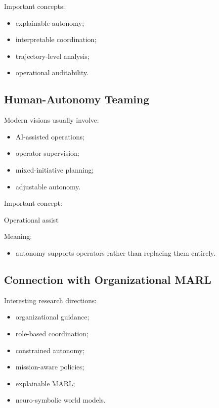 \documentclass[10pt,a4paper,twocolumn]{article}
\begin{document}
Important concepts:
\begin{itemize}
    \item explainable autonomy;
    \item interpretable coordination;
    \item trajectory-level analysis;
    \item operational auditability.
\end{itemize}


\subsection{Human-Autonomy Teaming}

Modern visions usually involve:
\begin{itemize}
    \item AI-assisted operations;
    \item operator supervision;
    \item mixed-initiative planning;
    \item adjustable autonomy.
\end{itemize}

Important concept:
\begin{center}
    Operational assist
\end{center}

Meaning:
\begin{itemize}
    \item autonomy supports operators rather than replacing them entirely.
\end{itemize}


\subsection{Connection with Organizational MARL}

Interesting research directions:
\begin{itemize}
    \item organizational guidance;
    \item role-based coordination;
    \item constrained autonomy;
    \item mission-aware policies;
    \item explainable MARL;
    \item neuro-symbolic world models.
\end{itemize}
\end{document}

